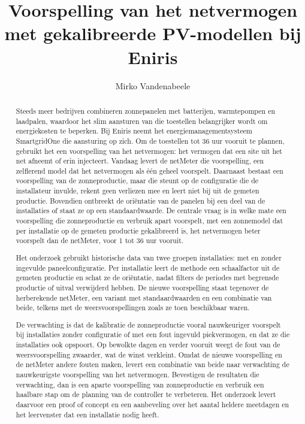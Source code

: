 \documentclass{hogent-article}
\title{Voorspelling van het netvermogen met gekalibreerde PV-modellen bij Eniris}
\author{Mirko Vandenabeele}
\begin{document}
  
\begin{abstract}
  Steeds meer bedrijven combineren zonnepanelen met batterijen, warmtepompen en laadpalen, waardoor het slim aansturen van die toestellen belangrijker wordt om energiekosten te beperken. Bij Eniris neemt het energiemanagementsysteem SmartgridOne die aansturing op zich. Om de toestellen tot 36 uur vooruit te plannen, gebruikt het een voorspelling van het netvermogen: het vermogen dat een site uit het net afneemt of erin injecteert. Vandaag levert de netMeter die voorspelling, een zelflerend model dat het netvermogen als één geheel voorspelt. Daarnaast bestaat een voorspelling van de zonneproductie, maar die steunt op de configuratie die de installateur invulde, rekent geen verliezen mee en leert niet bij uit de gemeten productie. Bovendien ontbreekt de oriëntatie van de panelen bij een deel van de installaties of staat ze op een standaardwaarde. De centrale vraag is in welke mate een voorspelling die zonneproductie en verbruik apart voorspelt, met een zonnemodel dat per installatie op de gemeten productie gekalibreerd is, het netvermogen beter voorspelt dan de netMeter, voor 1 tot 36 uur vooruit.

  Het onderzoek gebruikt historische data van twee groepen installaties: met en zonder ingevulde paneelconfiguratie. Per installatie leert de methode een schaalfactor uit de gemeten productie en schat ze de oriëntatie, nadat filters de periodes met begrensde productie of uitval verwijderd hebben. De nieuwe voorspelling staat tegenover de herberekende netMeter, een variant met standaardwaarden en een combinatie van beide, telkens met de weersvoorspellingen zoals ze toen beschikbaar waren.

  De verwachting is dat de kalibratie de zonneproductie vooral nauwkeuriger voorspelt bij installaties zonder configuratie of met een fout ingevuld piekvermogen, en dat ze die installaties ook opspoort. Op bewolkte dagen en verder vooruit weegt de fout van de weersvoorspelling zwaarder, wat de winst verkleint. Omdat de nieuwe voorspelling en de netMeter andere fouten maken, levert een combinatie van beide naar verwachting de nauwkeurigste voorspelling van het netvermogen. Bevestigen de resultaten die verwachting, dan is een aparte voorspelling van zonneproductie en verbruik een haalbare stap om de planning van de controller te verbeteren. Het onderzoek levert daarvoor een proof of concept en een aanbeveling over het aantal heldere meetdagen en het leervenster dat een installatie nodig heeft.
\end{abstract}

\tableofcontents



\printbibliography[heading=bibintoc]
\end{document}
